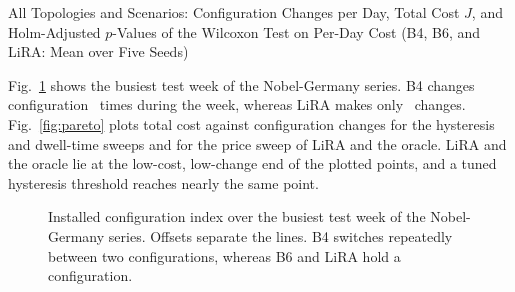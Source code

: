 \documentclass[preprint,12pt]{elsarticle}
\begin{document}
\begin{table}[t]
\centering
\caption{All Topologies and Scenarios: Configuration Changes per Day, Total Cost $J$, and Holm-Adjusted $p$-Values of the Wilcoxon Test on Per-Day Cost (B4, B6, and LiRA: Mean over Five Seeds)}
\label{tab:scen}
\footnotesize
\setlength{\tabcolsep}{3.5pt}
\begin{adjustbox}{max width=\textwidth}\end{adjustbox}
\end{table}

Fig.~\ref{fig:case} shows the busiest test week of the Nobel-Germany series. B4 changes configuration \caseBFourchg\ times during the week, whereas LiRA makes only \caseLiRAchg\ changes. Fig.~\ref{fig:pareto} plots total cost against configuration changes for the hysteresis and dwell-time sweeps and for the price sweep of LiRA and the oracle. LiRA and the oracle lie at the low-cost, low-change end of the plotted points, and a tuned hysteresis threshold reaches nearly the same point.

\begin{figure}[t]
\centering
{}
\caption{Installed configuration index over the busiest test week of the Nobel-Germany series. Offsets separate the lines. B4 switches repeatedly between two configurations, whereas B6 and LiRA hold a configuration.}
\label{fig:case}
\end{figure}
\end{document}
